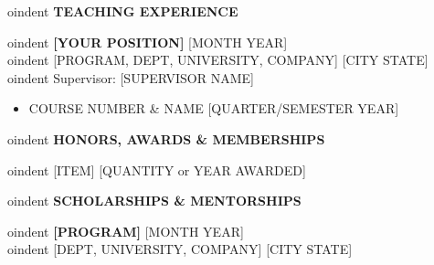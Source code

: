 \documentclass[12pt]{article}
\begin{document}

\begin{center}
	{
oindent \bfseries TEACHING EXPERIENCE}
\end{center}


oindent
{\bfseries [YOUR POSITION]} \hfill [MONTH YEAR] \\ 

oindent [PROGRAM, DEPT, UNIVERSITY, COMPANY] \hfill [CITY STATE] \\ 

oindent Supervisor: [SUPERVISOR NAME]

\vspace{6pt}
\begin{itemize} \itemsep -2pt %
	\item COURSE NUMBER \& NAME \hfill [QUARTER/SEMESTER YEAR]
\end{itemize}


\vspace{0.2in} %


\begin{center}
	{
oindent \bfseries HONORS, AWARDS \& MEMBERSHIPS}
\end{center}

 
\vspace{8pt} %

oindent
[ITEM] \hfill [QUANTITY or YEAR AWARDED] \\


\vspace{0.2in} %


\begin{center}
	{
oindent \bfseries SCHOLARSHIPS \& MENTORSHIPS}
\end{center}

\vspace{8pt} %


oindent
{\bfseries [PROGRAM]} \hfill [MONTH YEAR] \\ 

oindent [DEPT, UNIVERSITY, COMPANY] \hfill [CITY STATE] \\ 
\end{document}
